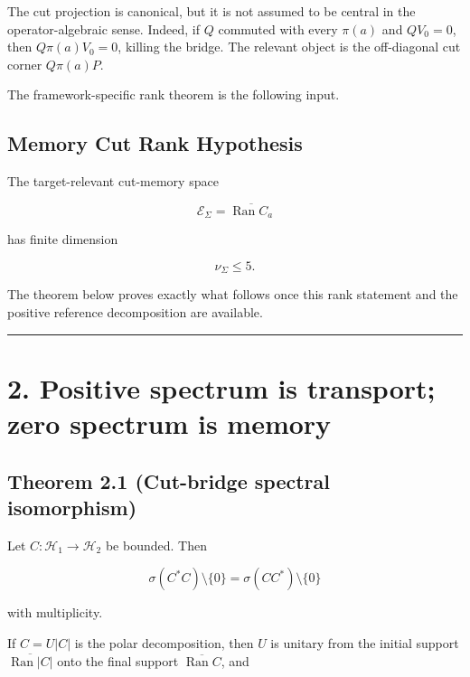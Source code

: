 The cut projection is canonical, but it is not assumed to be central in the
operator-algebraic sense. Indeed, if \(Q\) commuted with every \(\pi(a)\) and
\(QV_0=0\), then \(Q\pi(a)V_0=0\), killing the bridge. The relevant object is
the off-diagonal cut corner \(Q\pi(a)P\).

The framework-specific rank theorem is the following input.

\hypertarget{memory-cut-rank-hypothesis}{%
\subsection{Memory Cut Rank Hypothesis}\label{memory-cut-rank-hypothesis}}

The target-relevant cut-memory space

\[
\mathcal E_\Sigma
=
\overline{\operatorname{Ran} C_a}
\]

has finite dimension

\[
\nu_\Sigma\le 5.
\]

The theorem below proves exactly what follows once this rank statement and the
positive reference decomposition are available.

\begin{center}\rule{0.5\linewidth}{0.5pt}\end{center}

\hypertarget{positive-spectrum-is-transport-zero-spectrum-is-memory}{%
\section{2. Positive spectrum is transport; zero spectrum is memory}\label{positive-spectrum-is-transport-zero-spectrum-is-memory}}

\hypertarget{theorem-2.1-cut-bridge-spectral-isomorphism}{%
\subsection{Theorem 2.1 (Cut-bridge spectral isomorphism)}\label{theorem-2.1-cut-bridge-spectral-isomorphism}}

Let \(C:\mathcal H_1\to\mathcal H_2\) be bounded. Then

\[
\sigma(C^*C)\setminus\{0\}
=
\sigma(CC^*)\setminus\{0\}
\]

with multiplicity.

If \(C=U|C|\) is the polar decomposition, then \(U\) is unitary from the
initial support \(\overline{\operatorname{Ran}|C|}\) onto the final support
\(\overline{\operatorname{Ran}C}\), and

